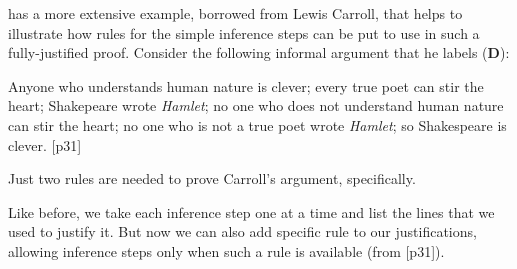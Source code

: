 \cite{Smi20} has a more extensive example, borrowed from Lewis Carroll, that
helps to illustrate how rules for the simple inference steps can be put to use
in such a fully-justified proof. Consider the following informal argument that
he labels (\textbf{D}):

\begin{argument}
\item[\textbf{D}] Anyone who understands human nature is clever; every true
  poet can stir the heart; Shakepeare wrote \emph{Hamlet}; no one who does not
  understand human nature can stir the heart; no one who is not a true poet
  wrote \emph{Hamlet}; so Shakespeare is clever.
  \cite{Smi20}[p31]
\end{argument}

Just two rules are needed to prove Carroll's argument, specifically.


Like before, we take each inference step one at a time and list the lines that
we used to justify it. But now we can also add specific rule to our
justifications, allowing inference steps only when such a rule is available
(from \cite{Smi20}[p31]).


